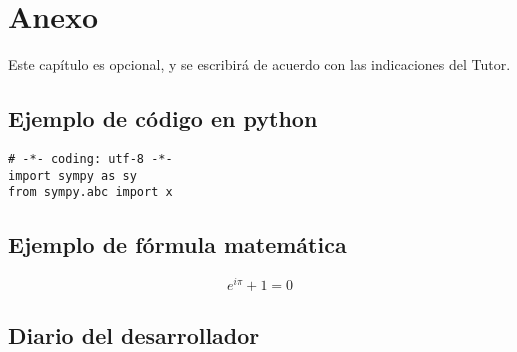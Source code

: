 \chapter*{Anexo}
Este capítulo es opcional, y se escribirá de acuerdo con las indicaciones del Tutor. 


\section{Ejemplo de código en python}
\begin{lstlisting}[style=Python]
# -*- coding: utf-8 -*-
import sympy as sy
from sympy.abc import x
\end{lstlisting}

\section{Ejemplo de fórmula matemática}
$$e^{i \pi} + 1 = 0 $$

\section{Diario del desarrollador}
